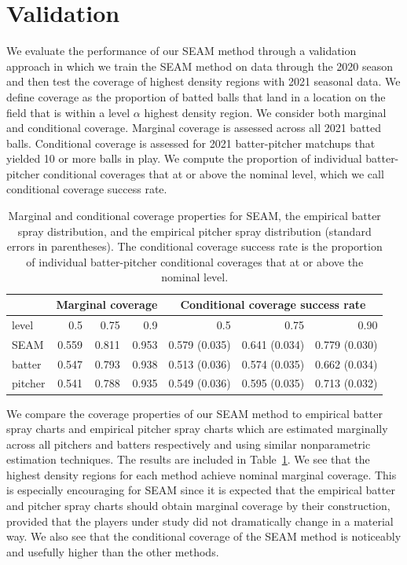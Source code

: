 \documentclass[12pt]{article}
\begin{document}
\section{Validation}

We evaluate the performance of our SEAM method through a validation approach in which we train the SEAM method on data through the 2020 season and then test the coverage of highest density regions with 2021 seasonal data. We define coverage as the proportion of batted balls that land in a location on the field that is within a level $\alpha$ highest density region. We consider both marginal and conditional coverage. Marginal coverage is assessed across all 2021 batted balls. Conditional coverage is assessed for 2021 batter-pitcher matchups that yielded 10 or more balls in play. We compute the proportion of individual batter-pitcher conditional coverages that at or above the nominal level, which we call conditional coverage success rate.

\begin{table}
\begin{center}
\begin{tabular}{l|rrr ||rrr }
  & \multicolumn{3}{c||}{Marginal coverage} & \multicolumn{3}{|c}{Conditional coverage success rate} \\
  \hline
level  & 0.5 & 0.75 & 0.9 & 0.5 & 0.75 & 0.90 \\
\hline
SEAM & 0.559 & 0.811 & 0.953 & 0.579 (0.035) & 0.641 (0.034) & 0.779 (0.030) \\
batter & 0.547 & 0.793 & 0.938 & 0.513 (0.036) & 0.574 (0.035) & 0.662 (0.034) \\
pitcher & 0.541 & 0.788 & 0.935 & 0.549 (0.036) & 0.595 (0.035) & 0.713 (0.032) \\
\end{tabular}		
\end{center}
\caption{Marginal and conditional coverage properties for SEAM, the empirical batter spray distribution, and the empirical pitcher spray distribution (standard errors in parentheses). The conditional coverage success rate is the proportion of individual batter-pitcher conditional coverages that at or above the nominal level. }
\label{Tab:coverage}
\end{table}


We compare the coverage properties of our SEAM method to empirical batter spray charts and empirical pitcher spray charts which are estimated marginally across all pitchers and batters respectively and using similar nonparametric estimation techniques. The results are included in Table~\ref{Tab:coverage}. We see that the highest density regions for each method achieve nominal marginal coverage. This is especially encouraging for SEAM since it is expected that the empirical batter and pitcher spray charts should obtain marginal coverage by their construction, provided that the players under study did not dramatically change in a material way. We also see that the conditional coverage of the SEAM method is noticeably and usefully higher than the other methods. 
\end{document}

